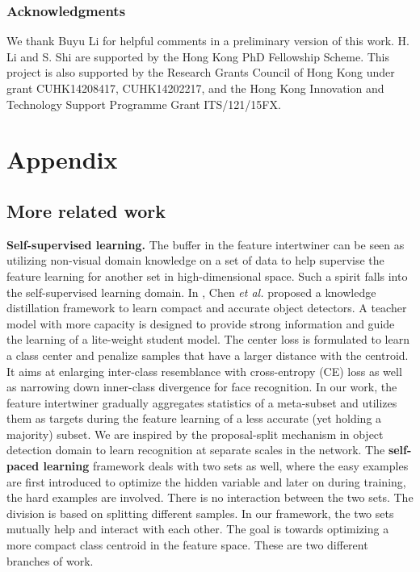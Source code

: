 \documentclass{article} \usepackage{iclr2019_conference,times}
\begin{document}
\subsubsection*{Acknowledgments}
We thank Buyu Li for helpful comments in a preliminary version of this work. H. Li and S. Shi are supported by the Hong Kong PhD Fellowship Scheme. This project is also supported by the
Research Grants Council of Hong Kong under grant 
CUHK14208417, CUHK14202217, and the Hong Kong Innovation and Technology Support Programme Grant ITS/121/15FX.





\section{Appendix}

\subsection{More related work}
\textbf{Self-supervised learning.} The buffer in the feature intertwiner can be seen as utilizing non-visual domain knowledge on a set of data to help 
supervise the feature learning for another set in high-dimensional space. Such a spirit falls into the self-supervised learning domain.
In \citep{chen2017_obj_det_data_dis}, Chen \textit{et al.} proposed a knowledge distillation framework to learn compact and accurate object
detectors. A teacher model with more capacity is designed to provide strong information and guide the learning of a lite-weight student model. 
The center loss \citep{wen2016_center_loss} is formulated to learn a class center and penalize samples that have a larger distance with the centroid. 
It aims at enlarging inter-class resemblance with cross-entropy (CE) loss as well as narrowing down  inner-class divergence for face recognition. 
In our work,
the feature intertwiner gradually aggregates statistics of a meta-subset and utilizes them as targets
during the feature learning of a less accurate (yet holding a majority) subset. 
We are inspired by the proposal-split mechanism in object detection domain to learn recognition at separate scales in the network.
{
The \textbf{self-paced learning} framework \citep{kumar2010_self_paced} deals with two sets as well, where the easy examples are first introduced to optimize the hidden variable and later on during training, the hard examples are involved. There is no interaction between the two sets. The division is based on splitting different samples. In our framework, the two sets mutually help and interact with each other. The goal is towards optimizing a more compact class centroid in the feature space. 
These are two different branches of work.
}
\end{document}
